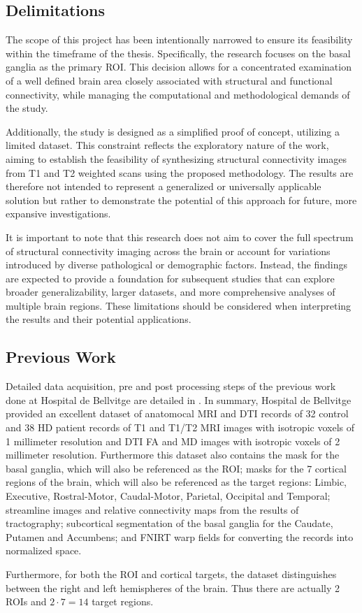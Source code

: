 \subsection{Delimitations}

The scope of this project has been intentionally narrowed to ensure its feasibility within the timeframe of the thesis. Specifically, the research focuses on the basal ganglia as the primary \ac{ROI}. This decision allows for a concentrated examination of a well defined brain area closely associated with structural and functional connectivity, while managing the computational and methodological demands of the study.\par
Additionally, the study is designed as a simplified proof of concept, utilizing a limited dataset. This constraint reflects the exploratory nature of the work, aiming to establish the feasibility of synthesizing structural connectivity images from T1 and T2 weighted scans using the proposed methodology. The results are therefore not intended to represent a generalized or universally applicable solution but rather to demonstrate the potential of this approach for future, more expansive investigations.\par
It is important to note that this research does not aim to cover the full spectrum of structural connectivity imaging across the brain or account for variations introduced by diverse pathological or demographic factors. Instead, the findings are expected to provide a foundation for subsequent studies that can explore broader generalizability, larger datasets, and more comprehensive analyses of multiple brain regions. These limitations should be considered when interpreting the results and their potential applications.

\subsection{Previous Work}

Detailed data acquisition, pre and post processing steps of the previous work done at Hospital de Bellvitge are detailed in . In summary, Hospital de Bellvitge provided an excellent dataset of anatomocal \ac{MRI} and \ac{DTI} records of 32 control and 38 \ac{HD} patient records of T1 and T1/T2 \ac{MRI} images with isotropic voxels of 1 millimeter resolution and \ac{DTI} \ac{FA} and \ac{MD} images with isotropic voxels of 2 millimeter resolution. Furthermore this dataset also contains the mask for the basal ganglia, which will also be referenced as the \ac{ROI}; masks for the 7 cortical regions of the brain, which will also be referenced as the target regions: Limbic, Executive, Rostral-Motor, Caudal-Motor, Parietal, Occipital and Temporal; streamline images and relative connectivity maps from the results of tractography; subcortical segmentation of the basal ganglia for the Caudate, Putamen and Accumbens; and \ac{FNIRT} warp fields for converting the records into normalized space.\par
Furthermore, for both the \ac{ROI} and cortical targets, the dataset distinguishes between the right and left hemispheres of the brain. Thus there are actually 2 \ac{ROI}s and $2 \cdot 7=14$ target regions.

